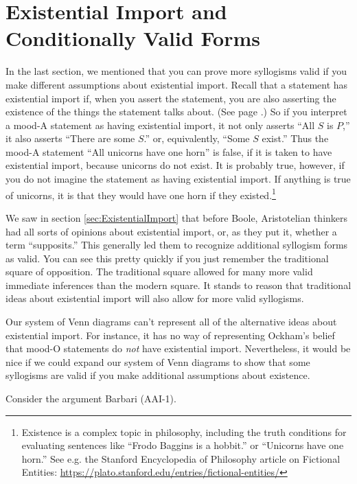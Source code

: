 
\section{Existential Import and Conditionally Valid Forms}

\label{sec:conditionally_valid_forms}
In the last section, we mentioned that you can prove more syllogisms valid if you make different assumptions about existential import. Recall that a statement has existential import if, when you assert the statement, you are also asserting the existence of the things the statement talks about. (See page \pageref{def:Existential_import}.) So if you interpret a mood-A statement as having existential import, it not only asserts ``All $S$ is $P$,'' it also asserts ``There are some $S$.'' or, equivalently, ``Some $S$ exist.'' Thus the mood-A statement ``All unicorns have one horn'' is false, if it is taken to have existential import, because unicorns do not exist. It is probably true, however, if you do not imagine the statement as having existential import. If anything is true of unicorns, it is that they would have one horn if they existed.\footnote{Existence is a complex topic in philosophy, including the truth conditions for evaluating sentences like ``Frodo Baggins is a hobbit.'' or ``Unicorns have one horn.'' See e.g. the Stanford Encyclopedia of Philosophy article on Fictional Entities: \href{https://plato.stanford.edu/entries/fictional-entities/}{https://plato.stanford.edu/entries/fictional-entities/}}

We saw in section \ref{sec:ExistentialImport} that before Boole, Aristotelian thinkers had all sorts of opinions about existential import, or, as they put it, whether a term ``supposits.'' This generally led them to recognize additional syllogism forms as valid. You can see this pretty quickly if you just remember the traditional square of opposition. The traditional square allowed for many more valid immediate inferences than the modern square. It stands to reason that traditional ideas about existential import will also allow for more valid syllogisms.

Our system of Venn diagrams can't represent all of the alternative ideas about existential import. For instance, it has no way of representing Ockham's belief that mood-O statements do \emph{not} have existential import. Nevertheless, it would be nice if we could expand our system of Venn diagrams to show that some syllogisms are valid if you make additional assumptions about existence.

Consider the argument Barbari (AAI-1).

